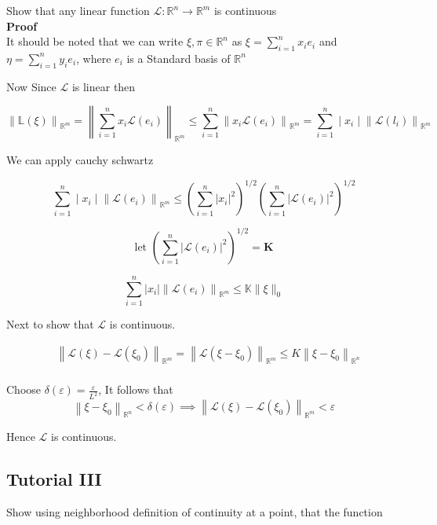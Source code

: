 \documentclass{article}
\begin{document}
Show that any linear function $\mathcal{L}: \mathbb{R}^{n} \rightarrow \mathbb{R}^{m}$ is continuous\\


\textbf{Proof}\\

It should be noted that we can write $\xi, \pi \in \mathbb{R}^{n}$ as $\xi=\sum_{i=1}^{n} x_{i} e_{i}$ and $\eta=\sum_{i=1}^{n} y_{i} e_{i}$, where $e_{i}$ is a Standard basis of $\mathbb{R}^{n}$

 Now Since $\mathcal{L}$ is linear then

$$
\left\|\mathbb{L}(\xi)\right\|_{\mathbb{R}^{m}}=\left\|\sum_{i=1}^{n} x_{i} \mathcal{L}\left(e_{i}\right)\right\|_{\mathbb{R}^{m}} \leq \sum_{i=1}^{n}\left\|x_{i} \mathcal{L}\left(e_{i}\right)\right\|_{\mathbb{R}^{m}}=\sum_{i=1}^{n} \mid x_{i}\mid\left\|\mathcal{L}\left(l_{i}\right)\right\|_{\mathbb{R}^{m}}
$$

We can apply cauchy schwartz

$$
\sum_{i=1}^{n}\mid x_{i}\mid \left \| \mathcal{L}\left(e_{i}\right)\right\|_{\mathbb{R}^{m}} \leq\left(\sum_{i=1}^{n}\left|x_{i}\right|^{2}\right)^{1 / 2}\left(\sum_{i=1}^{n}\left|\mathcal{L}\left(e_{i}\right)\right|^{2}\right)^{1 / 2}$$

$$
\text{let } \left(\sum_{i=1}^{n}\left|\mathcal{L}\left(e_{i}\right)\right|^{2}\right)^{1 / 2}=\mathbf{K}$$

$$\sum_{i=1}^{n}\left|x_{i}\right|\left\| \mathcal{L}\left(e_{i}\right)\right\|_{\mathbb{R}^{m}} \leq \mathbb{K} \| \xi \|_{0}
$$

Next to show that $\mathcal{L}$ is continuous.

$$
\begin{aligned}
& \left\|\mathcal{L}(\xi)-\mathcal{L}\left(\xi_{0}\right)\right\|_{\mathbb{R}^{m}}=\left\|\mathcal{L}\left(\xi-\xi_{0}\right)\right\|_{\mathbb{R}^{m}} \leq K\left\|\xi-\xi_{0}\right\|_{\mathbb{R}^{n}} \\
\end{aligned}
$$

Choose $\delta(\varepsilon)=\frac{\varepsilon}{L^{2}}$, It follows that 
$$\left\|\xi-\xi_{0}\right\|_{\mathbb{R}^{n}}<\delta(\varepsilon) \implies \left\|\mathcal{L}(\xi)-\mathcal{L}\left(\xi_{0}\right)\right\|_{\mathbb{R}^{m}}<\varepsilon$$

Hence $\mathcal{L}$ is continuous.

\subsection{ Tutorial III }
Show using neighborhood definition of continuity at a point, that the function
\end{document}
